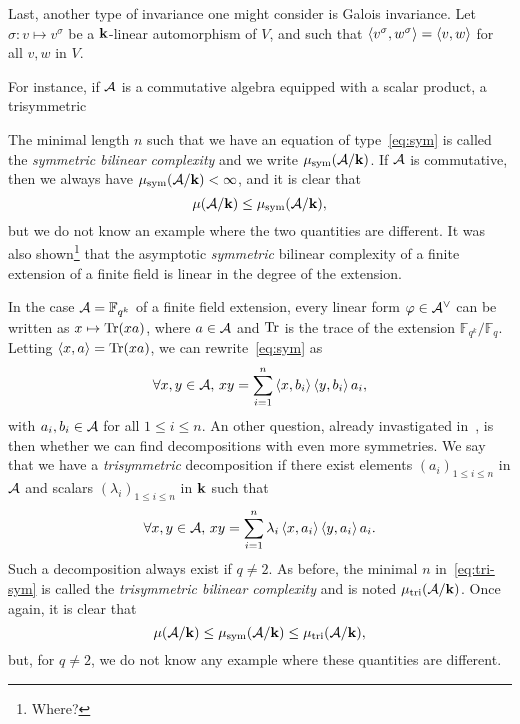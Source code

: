 \documentclass[11pt]{article}
\begin{document}
Last, another type of invariance one might consider is Galois invariance.
Let $\sigma:v\mapsto v^\sigma$ be a $\mathbf{k}$-linear automorphism of $V$,
and such that $\left\langle v^\sigma,w^\sigma\right\rangle=\left\langle v,w\right\rangle$ for all $v,w$ in $V$.



For instance, if $\mathcal{A}$ is a commutative algebra equipped with a scalar product,
a trisymmetric 

The minimal length $n$ such that we have an
equation of type~\eqref{eq:sym} is called the \emph{symmetric bilinear
complexity} and we write $\mu_{\text{sym}}(\mathcal{A}/\mathbf{k})$. If $\mathcal{A}$ is commutative, then
we always have $\mu_{\text{sym}}(\mathcal{A}/\mathbf{k})<\infty$, and it is clear that 
\[
  \mu(\mathcal{A}/\mathbf{k})\leq\mu_{\text{sym}}(\mathcal{A}/\mathbf{k}),
\]
but we do not know an example where the two quantities are different.
It was also shown\footnote{Where?} that the
asymptotic \emph{symmetric} bilinear complexity of a finite extension of a
finite field is linear in the degree of the extension.

In the case $\mathcal{A}=\mathbb{F}_{q^k}$ of a finite field extension, every linear form
$\varphi\in\mathcal{A}^\vee$ can be written as $x\mapsto\operatorname{Tr}(x a)$, where
$a\in\mathcal{A}$ and $\operatorname{Tr}$ is the trace of the extension
$\mathbb{F}_{q^k}/\mathbb{F}_q$. Letting $\left\langle x,a\right\rangle=\operatorname{Tr}(xa)$, we can
rewrite~\eqref{eq:sym} as
\begin{equation}
  \forall x, y\in\mathcal{A},\,xy = \sum_{i=1}^{n}\left\langle x,b_i\right\rangle\left\langle y,b_i\right\rangle a_i,
  \label{eq:sym-tr}
\end{equation}
with $a_i, b_i\in\mathcal{A}$ for all $1\leq i\leq n$. An other question,
already invastigated in~\cite{SL84}, is then
whether we can find decompositions with even more symmetries. We say that we
have a \emph{trisymmetric} decomposition if there exist elements $(a_i)_{1\leq i
\leq n}$ in $\mathcal{A}$ and scalars $(\lambda_i)_{1\leq i \leq n}$ in $\mathbf{k}$ such that
\begin{equation}
  \forall x, y\in\mathcal{A},\,xy =
  \sum_{i=1}^{n}\lambda_i\left\langle x,a_i\right\rangle\left\langle y,a_i\right\rangle a_i.
  \label{eq:tri-sym}
\end{equation}
Such a decomposition always exist if $q\neq2$. As before, the minimal $n$
in~\eqref{eq:tri-sym} is called the \emph{trisymmetric bilinear complexity} and
is noted $\mu_{\text{tri}}(\mathcal{A}/\mathbf{k})$. Once again, it is clear that
\[
  \mu(\mathcal{A}/\mathbf{k}) \leq \mu_{\text{sym}}(\mathcal{A}/\mathbf{k})\leq\mu_{\text{tri}}(\mathcal{A}/\mathbf{k}),
\]
but, for $q\neq2$, we do not know any example where these quantities are
different.
\end{document}
